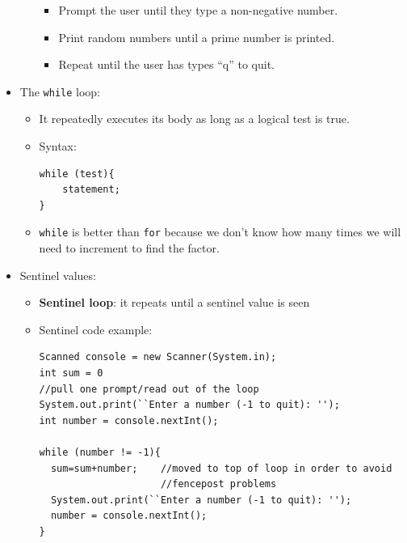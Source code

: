 \documentclass[a4paper]{article}
\newcommand{\inline}[1]{\lstinline!#1!}%
\begin{document}
\begin{itemize}
\begin{itemize}
      \begin{itemize}
        \item Prompt the user until they type a non-negative number.
        \item Print random numbers until a prime number is printed.
        \item Repeat until the user has types ``q'' to quit.
      \end{itemize}  
  \end{itemize}
\item The {\inline{while}} loop:
  \begin{itemize}
    \item It repeatedly executes its body as long as a logical test is true.
    \item Syntax:
    \begin{lstlisting}
while (test){
    statement;
}
    \end{lstlisting}
    \item \inline{while} is better than \inline{for} because we don't know how many times we will need to increment to find the factor.
  \end{itemize}
\item Sentinel values:
  \begin{itemize}
    \item \textbf{Sentinel loop}: it repeats until a sentinel value is seen
    \item Sentinel code example:
    \begin{lstlisting}
Scanned console = new Scanner(System.in);
int sum = 0
//pull one prompt/read out of the loop
System.out.print(``Enter a number (-1 to quit): '');
int number = console.nextInt();

while (number != -1){
  sum=sum+number;    //moved to top of loop in order to avoid
                     //fencepost problems
  System.out.print(``Enter a number (-1 to quit): '');
  number = console.nextInt();
}


\end{lstlisting}
\end{itemize}
\end{itemize}
\end{document}
